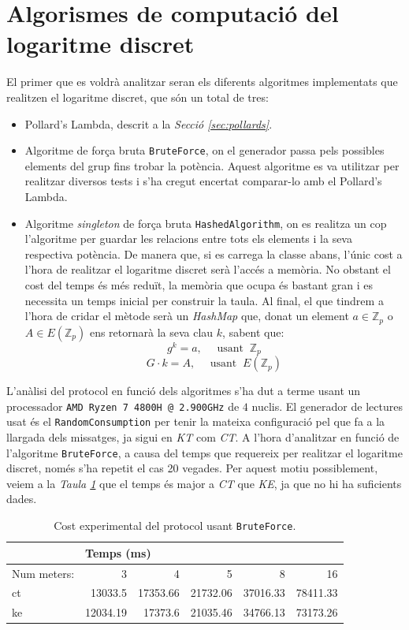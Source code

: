 \section{Algorismes de computació del logaritme discret}
El primer que es voldrà analitzar seran els diferents algoritmes implementats que realitzen el logaritme discret, que són un total de tres:
\begin{itemize}
	\item Pollard's Lambda, descrit a la \textit{Secció \ref{sec:pollards}}.
	\item Algoritme de força bruta \texttt{BruteForce}, on el generador passa pels possibles elements del grup fins trobar la potència. Aquest algoritme es va utilitzar per realitzar diversos tests i s'ha cregut encertat comparar-lo amb el Pollard's Lambda.
	\item Algoritme \textit{singleton} de força bruta \texttt{HashedAlgorithm}, on es realitza un cop l'algoritme per guardar les relacions entre tots els elements i la seva respectiva potència. De manera que, si es carrega la classe abans, l'únic cost a l'hora de realitzar el logaritme discret serà l'accés a memòria. No obstant el cost del temps és més reduït, la memòria que ocupa és bastant gran i es necessita un temps inicial per construir la taula. Al final, el que tindrem a l'hora de cridar el mètode serà un \textit{HashMap} que, donat un element $a \in \mathbb{Z}_p$ o  $A \in E(\mathbb{Z}_p)$ ens retornarà la seva clau $k$, sabent que:
	\[g^k = a ,\quad \textrm{ usant  }\ \mathbb{Z}_p\]
	\[G \cdot k = A,\quad \textrm{ usant  }\ E(\mathbb{Z}_p)\]
\end{itemize}
L'anàlisi del protocol en funció dels algoritmes s'ha dut a terme usant un processador \texttt{AMD Ryzen 7 4800H @ 2.900GHz} de $4$ nuclis. El generador de lectures usat és el \texttt{RandomConsumption} per tenir la mateixa configuració pel que fa a la llargada dels missatges, ja sigui en \textit{KT} com \textit{CT}. A l'hora d'analitzar en funció de l'algoritme \texttt{BruteForce}, a causa del temps que requereix per realitzar el logaritme discret, només s'ha repetit el cas 20 vegades. Per aquest motiu possiblement, veiem a la \textit{Taula \ref{tab:brute}} que el temps és major a \textit{CT }que \textit{KE}, ja que no hi ha suficients dades.
	\begin{table}[H]
		\centering
		\begin{tabular}{lrrrrr}
			\centering
			&\multicolumn{5}{l}{\centering Temps (ms)}\\
			\toprule
			Num meters: &           3  &       4  &           5  &            8  &            16 \\
			\midrule
			ct &  13033.5 &  17353.66 &  21732.06 &  37016.33 &  78411.33 \\
			ke &  12034.19 &  17373.6 &  21035.46 &  34766.13 &  73173.26 \\
			\bottomrule
		\end{tabular}
		\caption{Cost experimental del protocol usant \texttt{BruteForce}.}
		\label{tab:brute}
	\end{table}
